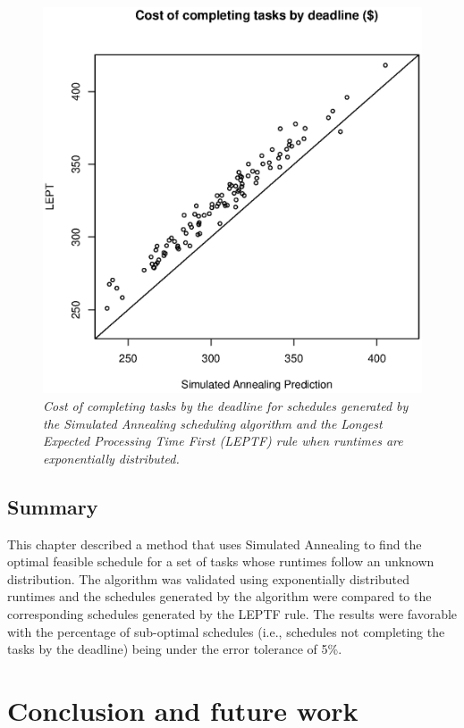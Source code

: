 \documentclass[12pt]{report}
\begin{document}
\begin{figure}
\includegraphics[width=1\textwidth]{validate-SA-LEPT-costs-2inst-100iter-10tasks.eps}
\caption{\textit{Cost of completing tasks by the deadline for schedules generated by the Simulated Annealing scheduling algorithm and the Longest Expected Processing Time First (LEPTF) rule when runtimes are exponentially distributed.}}
\label{fig:validate-SA-LEPT-costs-2inst-100iter-10tasks}
\end{figure}


\section{Summary}
This chapter described a method that uses Simulated Annealing to find the optimal feasible schedule for a set of tasks whose runtimes follow an unknown distribution.
The algorithm was validated using exponentially distributed runtimes and the schedules generated by the algorithm were compared to the corresponding schedules generated by the LEPTF rule.
The results were favorable with the percentage of sub-optimal schedules (i.e., schedules not completing the tasks by the deadline) being under the error tolerance of 5\%.


\chapter{Conclusion and future work}
\end{document}
